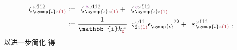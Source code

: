 \begin{subequations}
	\abovedisplayskip=-8pt
\begin{align} %
	\Xint{\begin{smallmatrix} ~ \\ {}^{}_{\mathcolor{gray}{-}} \\ ~ \end{smallmatrix}}{12}{\zeta}^{\;\! \mathcolor{gray}{\omega} \hat{1} \mathcolor{gray}{\check{1} \check{2}}}_{\;\! \symup{\iota} \mathcolor{gray}{z} \textcolor{Maroon}{(1)}} &:= \Xint{\begin{smallmatrix} ~ \\ {}^{}_{\mathcolor{gray}{-}} \\ ~ \end{smallmatrix}}{12}{\zeta}^{\;\! \textcolor{Plum}{\text{b}} \mathcolor{gray}{\omega} \hat{1} \mathcolor{gray}{\check{1} \check{2}}}_{\;\! \symup{\iota} \mathcolor{gray}{z} \textcolor{Maroon}{(1)}} + \Xint{\begin{smallmatrix} ~ \\ {}^{}_{\mathcolor{gray}{-}} \\ ~ \end{smallmatrix}}{12}{\zeta}^{\;\! \textcolor{Plum}{\text{e}} \mathcolor{gray}{\omega} \hat{1} \mathcolor{gray}{\check{1} \check{2}}}_{\;\! \symup{\iota} \mathcolor{gray}{z} \textcolor{Maroon}{(1)}} \label{eq:p<->n} \\ &:= \frac{1}{\mathbb{i} k_{\textcolor{Maroon}{\mathsf{o}}}^{\;\! \mathcolor{gray}{\omega}}} \Xint{\begin{smallmatrix} ~ \\ {}^{}_{\mathcolor{gray}{-}} \\ ~ \end{smallmatrix}}{13}{\varsigma}^{\;\! \mathcolor{gray}{\omega} \hat{1} \mathcolor{gray}{\check{1}}}_{\;\! \dot{2} \mathcolor{gray}{z} \textcolor{Maroon}{(1)}} \epsilon^{\hphantom{\symup{\iota}}\mathcolor{gray}{\check{2}}\dot{2}}_{\symup{\iota}} + \Xint{\begin{smallmatrix} ~ \\ {}^{}_{\mathcolor{gray}{-}} \\ ~ \end{smallmatrix}}{16}{\varepsilon}^{\;\! \mathcolor{gray}{\omega} \hat{1} \mathcolor{gray}{\check{1} \check{2}}}_{\;\! \symup{\iota} \mathcolor{gray}{z} \textcolor{Maroon}{(1)}}~,
\end{align}
\end{subequations}
以进一步简化  得
